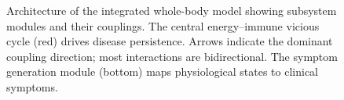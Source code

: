 \begin{figure}[htbp]
\caption{Architecture of the integrated whole-body model showing subsystem modules
and their couplings. The central energy--immune vicious cycle (red) drives disease
persistence. Arrows indicate the dominant coupling direction; most interactions are
bidirectional. The symptom generation module (bottom) maps physiological states to
clinical symptoms.}
\label{fig:integrated-systems-architecture}
\end{figure}
